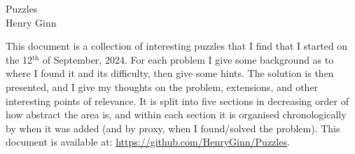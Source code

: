 \documentclass[hidelinks, 11 pt]{article}
\begin{document}
\newpage
\setcounter{page}{1}
\addtolength{\topmargin}{-1.6pt}
\thispagestyle{firstpage}

\begin{center}
    \vspace*{-20mm}
    \Huge Puzzles  \\
    \vspace{5mm}
    \large Henry Ginn  \\
\end{center}
\vspace{5mm}

This document is a collection of interesting puzzles that I find that I started on the 12$^\text{th}$ of September, 2024. For each problem I give some background as to where I found it and its difficulty, then give some hints. The solution is then presented, and I give my thoughts on the problem, extensions, and other interesting points of relevance. It is split into five sections in decreasing order of how abstract the area is, and within each section it is organised chronologically by when it was added (and by proxy, when I found/solved the problem). This document is available at: \url{https://github.com/HenryGinn/Puzzles}.

\tableofcontents

\renewcommand{\contentsname}{}

\newpage



\newpage

\newpage
\newpage
\newpage
\newpage
\newpage

\newpage


\fancyhf{}
\fancyhead[R]{}
\fancyfoot[C]{\thepage}



\end{document}
